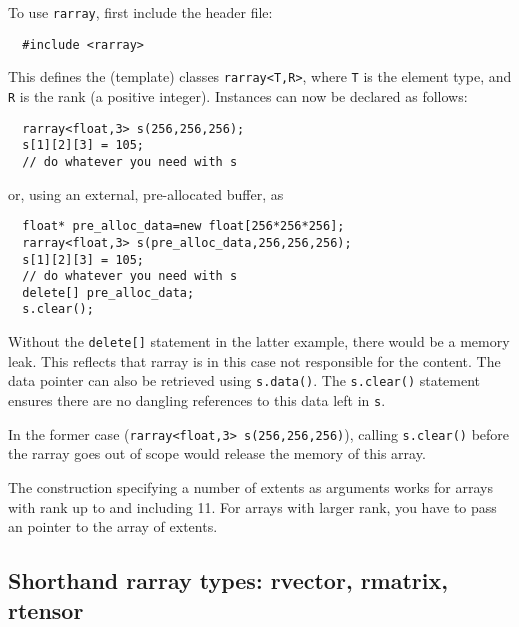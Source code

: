 \documentclass[11pt,twoside]{article}
\begin{document}
To use \texttt{rarray}, first include the header file:
\begin{framed}\vspace{-14pt}%
\begin{verbatim}
  #include <rarray>
\end{verbatim}%
\vspace{-14pt}
\end{framed}
\noindent
This defines the (template) classes \texttt{rarray{\tt<}T,R{\tt>}}, where
\texttt T is the element type, and \texttt R is the
rank (a positive integer).  Instances can now be
declared as follows:
\begin{framed}\vspace{-18pt}%
\begin{verbatim}
  rarray<float,3> s(256,256,256);
  s[1][2][3] = 105;
  // do whatever you need with s
\end{verbatim}%
\vspace{-14pt}
\end{framed}
\noindent
or, using an external, pre-allocated buffer, as
\begin{framed}\vspace{-18pt}%
\begin{verbatim}
  float* pre_alloc_data=new float[256*256*256];  
  rarray<float,3> s(pre_alloc_data,256,256,256);
  s[1][2][3] = 105;
  // do whatever you need with s
  delete[] pre_alloc_data;
  s.clear();
\end{verbatim}%
\vspace{-14pt}
\end{framed}
Without the \texttt{delete[]} statement in the latter example, there would be a memory leak. This reflects that rarray is in this case not responsible
for the content. The data pointer can also be retrieved using
\texttt{s.data()}. The \texttt{s.clear()} statement ensures there are
no dangling references to this data left in \texttt{s}. 

In the former case (\texttt{rarray<float,3> s(256,256,256)}), calling
\texttt{s.clear()} before the rarray goes out of scope would
release the memory of this array.

The construction specifying a number of extents as arguments works for arrays with rank up to and including 11. For arrays with larger rank, you have to pass an pointer to the array of extents.

\subsection{Shorthand rarray types: rvector, rmatrix, rtensor}
\end{document}

